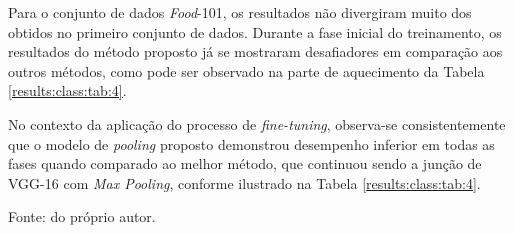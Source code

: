 Para o conjunto de dados \textit{Food}-101, os resultados não divergiram muito dos obtidos no primeiro conjunto de dados. Durante a fase inicial do treinamento, os resultados do método proposto já se mostraram desafiadores em comparação aos outros métodos, como pode ser observado na parte de aquecimento da Tabela \ref{results:class:tab:4}.

No contexto da aplicação do processo de \textit{fine-tuning}, observa-se consistentemente que o modelo de \textit{pooling} proposto demonstrou desempenho inferior em todas as fases quando comparado ao melhor método, que continuou sendo a junção de VGG-16 com \textit{Max Pooling}, conforme ilustrado na Tabela \ref{results:class:tab:4}.

\begin{table}[H]
    \centering
    \caption{Resultados por fase de \textit{fine-tuning} de VGG-16 aplicada no conjunto de dados \textit{Food}-101.}
    \label{results:class:tab:4}

    \vspace*{1 cm}
    Fonte: do próprio autor.
\end{table}

